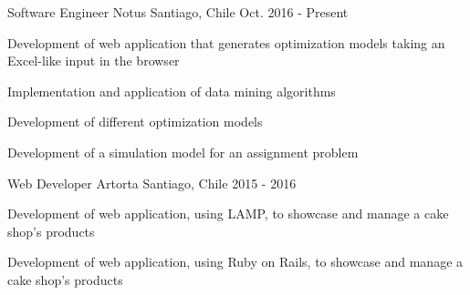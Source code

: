 

\begin{cventries}

  \cventry
    {Software Engineer} %
    {Notus} %
    {Santiago, Chile} %
    {Oct. 2016 - Present} %
    {
      \begin{cvitems} %
        \item {Development of web application that generates optimization models taking an Excel-like input in the browser}
        \item {Implementation and application of data mining algorithms}
        \item {Development of different optimization models}
        \item {Development of a simulation model for an assignment problem}
      \end{cvitems}
    }

  \cventry
    {Web Developer} %
    {Artorta} %
    {Santiago, Chile} %
    {2015 - 2016} %
    {
      \begin{cvitems} %
        \item {Development of web application, using LAMP, to showcase and manage a cake shop's products}
        \item {Development of web application, using Ruby on Rails, to showcase and manage a cake shop's products}
      \end{cvitems}
    }

\end{cventries}
